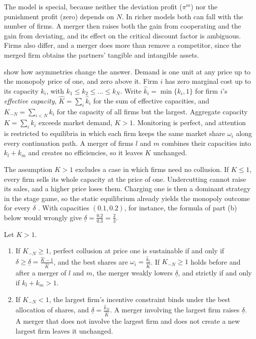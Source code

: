 The model is special, because neither the deviation profit ($\pi^m$) nor the punishment profit (zero) depends on
$N$. In richer models both can fall with the number of firms. A merger then raises both the gain from cooperating
and the gain from deviating, and its effect on the critical discount factor is ambiguous. Firms also differ, and a
merger does more than remove a competitor, since the merged firm obtains the partners' tangible and intangible
assets.

\citet{CompteJennyRey2002} show how asymmetries change the answer. Demand is one unit at any price up to the monopoly
price of one, and zero above it. Firm $i$ has zero marginal cost up to its capacity $k_i$, with $k_1 \le k_2 \le
\dots \le k_N$. Write $\hat k_i = \min\{k_i, 1\}$ for firm $i$'s \emph{effective capacity}, $\hat K = \sum_i\hat k_i$
for the sum of effective capacities, and $K_{-N} = \sum_{i < N}k_i$ for the capacity of all firms but the largest.
Aggregate capacity $K = \sum_i k_i$ exceeds market demand, $K > 1$. Monitoring is perfect, and attention is restricted
to equilibria in which each firm keeps the same market share $\omega_i$ along every continuation path.
A merger of firms $l$ and $m$ combines their capacities into $k_l + k_m$
and creates no efficiencies, so it leaves $K$ unchanged.

The assumption $K > 1$ excludes a case in which firms need no collusion. If $K \le 1$, every firm sells its whole capacity at
the price of one. Undercutting cannot raise its sales, and a higher price loses them. Charging one is then a dominant
strategy in the stage game, so the static equilibrium already yields the monopoly outcome for every $\delta$
\citep[Section 2]{CompteJennyRey2002}. With capacities $(0.1, 0.2)$, for instance, the formula of part (b) below
would wrongly give $\underline\delta = \frac{0.2}{0.3} = \frac{2}{3}$.

\begin{proposition}\label{prop:11-cjr}
Let $K > 1$.
\begin{enumerate}[label=(\alph*)]
\item If $K_{-N} \ge 1$, perfect collusion at price one is sustainable if and only if
$\delta \ge \underline\delta = \frac{\hat K - 1}{\hat K}$, and the best shares are $\omega_i = \frac{\hat
k_i}{\hat K}$. If $K_{-N} \ge 1$ holds before and after a merger of $l$ and $m$, the merger weakly lowers
$\underline\delta$, and strictly if and only if $k_l + k_m > 1$.
\item If $K_{-N} < 1$, the largest firm's incentive constraint binds under the best allocation of shares, and
$\underline\delta = \frac{\hat k_N}{\hat K}$. A merger involving the largest firm raises $\underline\delta$. A
merger that does not involve the largest firm and does not create a new largest firm leaves it unchanged.
\end{enumerate}
\end{proposition}

